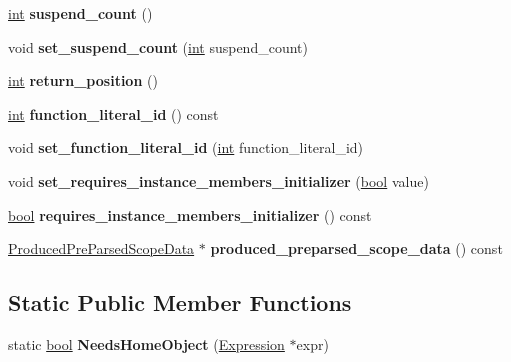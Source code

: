 \begin{DoxyCompactItemize}
\mbox{\hyperlink{classint}{int}} {\bfseries suspend\+\_\+count} ()
\item 
\mbox{\label{classv8_1_1internal_1_1FunctionLiteral_adcded0ce04dfc23ef8462fe1583492a0}} 
void {\bfseries set\+\_\+suspend\+\_\+count} (\mbox{\hyperlink{classint}{int}} suspend\+\_\+count)
\item 
\mbox{\label{classv8_1_1internal_1_1FunctionLiteral_a1ccaef3943604df5b8089b9a6cf0b067}} 
\mbox{\hyperlink{classint}{int}} {\bfseries return\+\_\+position} ()
\item 
\mbox{\label{classv8_1_1internal_1_1FunctionLiteral_a1c1557deeb58518614d28b07959e7c86}} 
\mbox{\hyperlink{classint}{int}} {\bfseries function\+\_\+literal\+\_\+id} () const
\item 
\mbox{\label{classv8_1_1internal_1_1FunctionLiteral_a84fb6382f5c0b25e73b1c85df0865e3b}} 
void {\bfseries set\+\_\+function\+\_\+literal\+\_\+id} (\mbox{\hyperlink{classint}{int}} function\+\_\+literal\+\_\+id)
\item 
\mbox{\label{classv8_1_1internal_1_1FunctionLiteral_a51fdd8fd553feaf69d24c8c6fb4953d6}} 
void {\bfseries set\+\_\+requires\+\_\+instance\+\_\+members\+\_\+initializer} (\mbox{\hyperlink{classbool}{bool}} value)
\item 
\mbox{\label{classv8_1_1internal_1_1FunctionLiteral_adaa4765cd0a7e6433bbce41b4b3e17a1}} 
\mbox{\hyperlink{classbool}{bool}} {\bfseries requires\+\_\+instance\+\_\+members\+\_\+initializer} () const
\item 
\mbox{\label{classv8_1_1internal_1_1FunctionLiteral_a42a6b4b8e76009acd0ce406aa5eaa987}} 
\mbox{\hyperlink{classv8_1_1internal_1_1ProducedPreParsedScopeData}{Produced\+Pre\+Parsed\+Scope\+Data}} $\ast$ {\bfseries produced\+\_\+preparsed\+\_\+scope\+\_\+data} () const
\end{DoxyCompactItemize}
\subsection*{Static Public Member Functions}
\begin{DoxyCompactItemize}
\item 
\mbox{\label{classv8_1_1internal_1_1FunctionLiteral_ad78102843077c6fd61438c3709d6d1ba}} 
static \mbox{\hyperlink{classbool}{bool}} {\bfseries Needs\+Home\+Object} (\mbox{\hyperlink{classv8_1_1internal_1_1Expression}{Expression}} $\ast$expr)
\end{DoxyCompactItemize}
